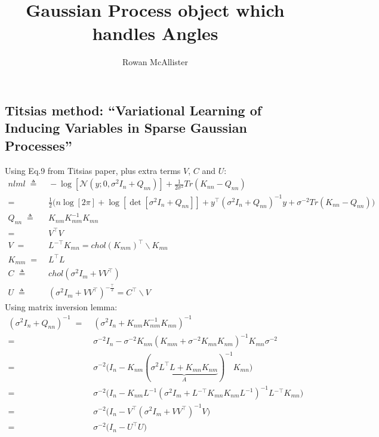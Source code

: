 \documentclass{article}
\title{Gaussian Process object which handles Angles}
\author{Rowan McAllister}
\newcommand{\N}{\mathcal{N}}
\newcommand{\inv}{^{-1}}
\newcommand{\invt}{{^{-\top}}}
\newcommand{\T}{^{\top}}
\newcommand{\nsqt}{^{-\tfrac{\top}{2}}}
\begin{document}
\maketitle

\subsection*{Titsias method: ``Variational Learning of Inducing Variables in Sparse Gaussian Processes''}


Using Eq.9 from Titsias paper, plus extra terms $V$, $C$ and $U$:
\begin{equation}
\begin{split}
nlml\;\triangleq&\;-\log[\N(y;0,\sigma^2I_n+Q_{nn})]+\tfrac{1}{2\sigma^2}Tr(K_{nn}-Q_{nn})\\
 =&\;\tfrac{1}{2} \big( n\log[2\pi] +\log[\det[\sigma^2I_n+Q_{nn}]] + y\T (\sigma^2I_n+Q_{nn})\inv y + \sigma^{-2}Tr(K_{nn}-Q_{nn}) \big) \\
Q_{nn}\;\triangleq&\;K_{nm}K_{mm}\inv K_{mn} \\
 =&\;V\T V\\
V\;=&\; L^{-\top}K_{mn} = chol(K_{mm})\T \backslash K_{mn}\\
K_{mm}\;=&\;L\T L\\
C\;\triangleq&\; chol(\sigma^2 I_m + VV\T) \\
U\;\triangleq&\; (\sigma^2 I_m +VV\T)\nsqt = C\T \backslash V
\end{split}
\end{equation}
Using matrix inversion lemma:
\begin{equation}
\begin{split}
(\sigma^2I_n+Q_{nn})\inv\;
 =&\; (\sigma^2I_n+K_{nm}K_{mm}\inv K_{mn})\inv \\
 =&\; \sigma^{-2}I_n-\sigma^{-2}K_{nm}(K_{mm}+\sigma^{-2}K_{mn} K_{nm})\inv K_{mn}\sigma^{-2} \\
 =&\; \sigma^{-2} \big( I_n - K_{nm}(\underbrace{\sigma^2 L\T L+K_{mn} K_{nm}}_{A})\inv K_{mn} \big)\\
 =&\; \sigma^{-2} \big( I_n - K_{nm}L\inv(\sigma^2I_m +L\invt K_{mn} K_{nm}L\inv)\inv L\invt K_{mn} \big)\\
 =&\; \sigma^{-2} \big( I_n - V\T(\sigma^2I_m +VV\T)\inv V \big)\\
 =&\; \sigma^{-2} \big( I_n - U\T U \big)
\end{split}
\end{equation}
\end{document}
